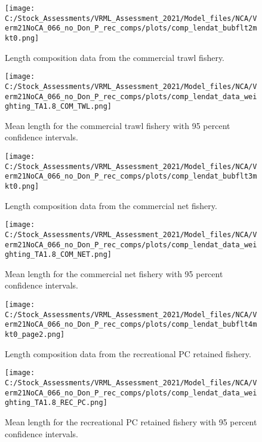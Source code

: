 \documentclass[11pt,
  english,
  a4paper,
]{article}
\begin{document}
\begin{figure}
\centering
\texttt{[image: C:/Stock\_Assessments/VRML\_Assessment\_2021/Model\_files/NCA/Verm21NoCA\_066\_no\_Don\_P\_rec\_comps/plots/comp\_lendat\_bubflt2mkt0.png]}
\caption{Length composition data from the commercial trawl fishery.\label{fig:len-data-COM-TWL}}
\end{figure}

\begin{figure}
\centering
\texttt{[image: C:/Stock\_Assessments/VRML\_Assessment\_2021/Model\_files/NCA/Verm21NoCA\_066\_no\_Don\_P\_rec\_comps/plots/comp\_lendat\_data\_weighting\_TA1.8\_COM\_TWL.png]}
\caption{Mean length for the commercial trawl fishery with 95 percent confidence intervals.\label{fig:mean-com-len-data-COM-TWL}}
\end{figure}

\begin{figure}
\centering
\texttt{[image: C:/Stock\_Assessments/VRML\_Assessment\_2021/Model\_files/NCA/Verm21NoCA\_066\_no\_Don\_P\_rec\_comps/plots/comp\_lendat\_bubflt3mkt0.png]}
\caption{Length composition data from the commercial net fishery.\label{fig:len-data-COM-NET}}
\end{figure}

\begin{figure}
\centering
\texttt{[image: C:/Stock\_Assessments/VRML\_Assessment\_2021/Model\_files/NCA/Verm21NoCA\_066\_no\_Don\_P\_rec\_comps/plots/comp\_lendat\_data\_weighting\_TA1.8\_COM\_NET.png]}
\caption{Mean length for the commercial net fishery with 95 percent confidence intervals.\label{fig:mean-com-len-data-COM-NET}}
\end{figure}

\begin{figure}
\centering
\texttt{[image: C:/Stock\_Assessments/VRML\_Assessment\_2021/Model\_files/NCA/Verm21NoCA\_066\_no\_Don\_P\_rec\_comps/plots/comp\_lendat\_bubflt4mkt0\_page2.png]}
\caption{Length composition data from the recreational PC retained fishery.\label{fig:len-data-REC-PC}}
\end{figure}

\begin{figure}
\centering
\texttt{[image: C:/Stock\_Assessments/VRML\_Assessment\_2021/Model\_files/NCA/Verm21NoCA\_066\_no\_Don\_P\_rec\_comps/plots/comp\_lendat\_data\_weighting\_TA1.8\_REC\_PC.png]}
\caption{Mean length for the recreational PC retained fishery with 95 percent confidence intervals.\label{fig:mean-com-len-data-REC-PC}}
\end{figure}
\end{document}
